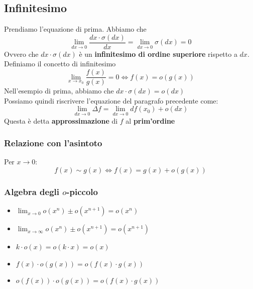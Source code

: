 \documentclass{report}
\begin{document}
    \subsection{Infinitesimo}
        Prendiamo l'equazione di prima. Abbiamo che \\
        $$\lim_{dx \to 0}\frac{dx \cdot \sigma\left(dx\right)}{dx} = \lim_{dx \to 0}\sigma\left(dx\right) = 0$$
        Ovvero che $dx \cdot \sigma\left(dx\right)$ è un \textbf{infinitesimo di ordine superiore } rispetto a $dx$. \\
        Definiamo il concetto di infinitesimo
        $$\lim_{x \to x_0} \frac{f\left(x\right)}{g\left(x\right)} = 0 \Longleftrightarrow f\left(x\right) = o\left(g\left(x\right)\right)$$
        Nell'esempio di prima, abbiamo che $dx \cdot \sigma\left(dx\right) = o\left(dx\right)$ \\
        Possiamo quindi riscrivere l'equazione del paragrafo precedente come:
        $$\lim_{dx \to 0}\Delta f = \lim_{dx \to 0}df\left(x_0\right) + o\left(dx\right)$$
        Questa è detta \textbf{approssimazione} di $f$ al \textbf{prim'ordine}
        \subsubsection{Relazione con l'asintoto}
            Per $x \to 0$:
            $$f\left(x\right) \sim g\left(x\right) \Longleftrightarrow f\left(x\right) = g\left(x\right) + o\left(g\left(x\right)\right)$$
        \subsubsection{Algebra degli $o$-piccolo}
            \begin{itemize}
                \item $\lim_{x \to 0} o\left(x^n\right) \pm o\left(x^{n+1}\right) = o\left(x^n\right)$
                \item $\lim_{x \to \infty} o\left(x^n\right) \pm o\left(x^{n+1}\right) = o\left(x^{n+1}\right)$
                \item $k \cdot o\left(x\right) = o\left(k \cdot x\right) = o\left(x\right)$
                \item $f\left(x\right) \cdot o\left(g\left(x\right)\right) = o\left(f\left(x\right) \cdot g\left(x\right)\right)$
                \item $o\left(f\left(x\right)\right) \cdot o\left(g\left(x\right)\right) = o\left(f\left(x\right) \cdot g\left(x\right)\right)$
            \end{itemize}
\end{document}
